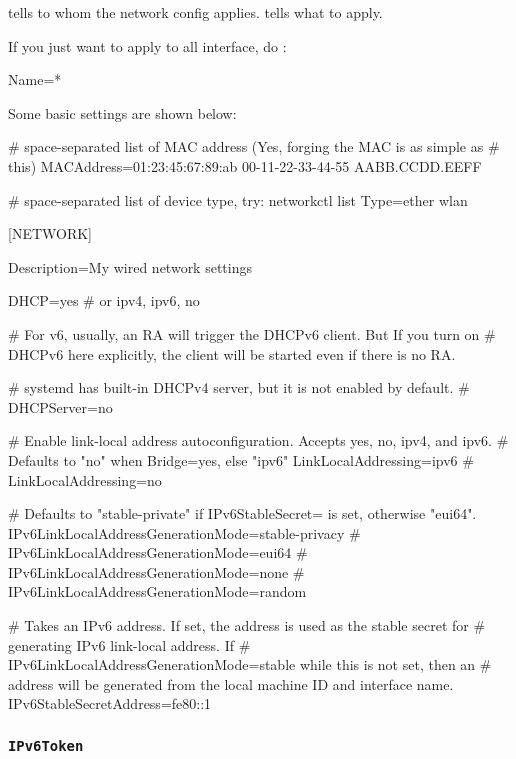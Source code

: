 \secM{} tells to whom the network config applies.
\secN{} tells what to apply.

 If
you just want to apply to all interface, do :
\begin{simplecf}
  [Match]
  Name=*
\end{simplecf}

Some basic settings are shown below:
\begin{simplecf}
  [MATCH]

# space-separated list of MAC address (Yes, forging the MAC is as simple as
# this)
MACAddress=01:23:45:67:89:ab 00-11-22-33-44-55 AABB.CCDD.EEFF

# space-separated list of device type, try: networkctl list
Type=ether wlan

[NETWORK]

Description=My wired network settings

DHCP=yes                        # or ipv4, ipv6, no

# For v6, usually, an RA will trigger the DHCPv6 client. But If you turn on
# DHCPv6 here explicitly, the client will be started even if there is no RA.

# systemd has built-in DHCPv4 server, but it is not enabled by default.
# DHCPServer=no 

# Enable link-local address autoconfiguration. Accepts yes, no, ipv4, and ipv6.
# Defaults to "no" when Bridge=yes, else "ipv6"
LinkLocalAddressing=ipv6
# LinkLocalAddressing=no

# Defaults to "stable-private" if IPv6StableSecret= is set, otherwise "eui64".
IPv6LinkLocalAddressGenerationMode=stable-privacy
# IPv6LinkLocalAddressGenerationMode=eui64
# IPv6LinkLocalAddressGenerationMode=none
# IPv6LinkLocalAddressGenerationMode=random

# Takes an IPv6 address. If set, the address is used as the stable secret for
# generating IPv6 link-local address. If
# IPv6LinkLocalAddressGenerationMode=stable while this is not set, then an
# address will be generated from the local machine ID and interface name.
IPv6StableSecretAddress=fe80::1

\end{simplecf}

\subsubsection{\texttt{IPv6Token}}

